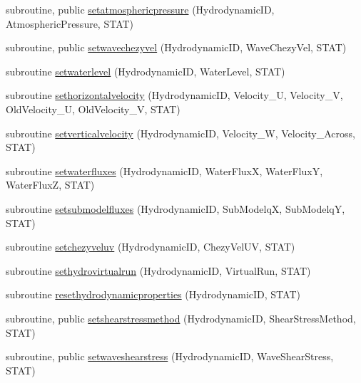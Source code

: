 \begin{DoxyCompactItemize}
subroutine, public \mbox{\hyperlink{namespacemodulehydrodynamic_ab767a1bf58d41f86c6b2ab58684d962d}{setatmosphericpressure}} (Hydrodynamic\+ID, Atmospheric\+Pressure, S\+T\+AT)
\item 
subroutine, public \mbox{\hyperlink{namespacemodulehydrodynamic_ad7a33c322002783aeb2b7b50ed690a4b}{setwavechezyvel}} (Hydrodynamic\+ID, Wave\+Chezy\+Vel, S\+T\+AT)
\item 
subroutine \mbox{\hyperlink{namespacemodulehydrodynamic_ac429c4fc2329d56d285f5389d5d57e55}{setwaterlevel}} (Hydrodynamic\+ID, Water\+Level, S\+T\+AT)
\item 
subroutine \mbox{\hyperlink{namespacemodulehydrodynamic_a57dc7c696d4679f3a6d7f8f297145b63}{sethorizontalvelocity}} (Hydrodynamic\+ID, Velocity\+\_\+U, Velocity\+\_\+V, Old\+Velocity\+\_\+U, Old\+Velocity\+\_\+V, S\+T\+AT)
\item 
subroutine \mbox{\hyperlink{namespacemodulehydrodynamic_a0ed7fd6441646298396381636f172534}{setverticalvelocity}} (Hydrodynamic\+ID, Velocity\+\_\+W, Velocity\+\_\+\+Across, S\+T\+AT)
\item 
subroutine \mbox{\hyperlink{namespacemodulehydrodynamic_a6c2c32efe21be75b5ffccf7b9d4dbcdb}{setwaterfluxes}} (Hydrodynamic\+ID, Water\+FluxX, Water\+FluxY, Water\+FluxZ, S\+T\+AT)
\item 
subroutine \mbox{\hyperlink{namespacemodulehydrodynamic_ab017d9a33e10a535dcc4b545900925de}{setsubmodelfluxes}} (Hydrodynamic\+ID, Sub\+ModelqX, Sub\+ModelqY, S\+T\+AT)
\item 
subroutine \mbox{\hyperlink{namespacemodulehydrodynamic_a62a3231781314de8d69f6f4216245361}{setchezyveluv}} (Hydrodynamic\+ID, Chezy\+Vel\+UV, S\+T\+AT)
\item 
subroutine \mbox{\hyperlink{namespacemodulehydrodynamic_a429223ac8f920fd2b743524bf353e8c1}{sethydrovirtualrun}} (Hydrodynamic\+ID, Virtual\+Run, S\+T\+AT)
\item 
subroutine \mbox{\hyperlink{namespacemodulehydrodynamic_a81fe705d1430f64e261259b13a8b46f8}{resethydrodynamicproperties}} (Hydrodynamic\+ID, S\+T\+AT)
\item 
subroutine, public \mbox{\hyperlink{namespacemodulehydrodynamic_abc0b4b19014469e3102675a4dbffe103}{setshearstressmethod}} (Hydrodynamic\+ID, Shear\+Stress\+Method, S\+T\+AT)
\item 
subroutine, public \mbox{\hyperlink{namespacemodulehydrodynamic_a820fb4f4565d7dc61e2cfa6517a1390f}{setwaveshearstress}} (Hydrodynamic\+ID, Wave\+Shear\+Stress, S\+T\+AT)
\item 

\end{DoxyCompactItemize}

